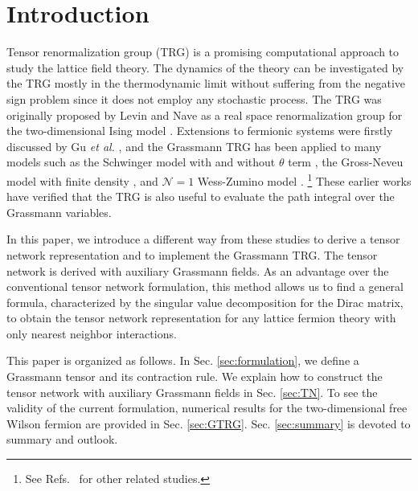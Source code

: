 
\section{Introduction}
\label{sec:introduction}

Tensor renormalization group (TRG) is a promising computational approach to study the lattice field theory. 
The dynamics of the theory can be investigated by the TRG
mostly in the thermodynamic limit without suffering from the negative sign problem
since it does not employ any stochastic process. 
The TRG was originally proposed by Levin and Nave as a 
real space renormalization group 
for the two-dimensional Ising model \cite{Levin:2006jai}. 
Extensions to fermionic systems were firstly discussed by Gu {\it et al.} \cite{Gu:2010yh,Gu:2013gba},  
and the Grassmann TRG has been applied to many models such as
the Schwinger model with and without $\theta$ term 
\cite{Shimizu:2014uva,Shimizu:2014fsa,Shimizu:2017onf}, 
the Gross-Neveu model with finite density \cite{Takeda:2014vwa}, 
and $\mathcal{N}=1$ Wess-Zumino model \cite{Kadoh:2018hqq}.
\footnote{See Refs.~\cite{Sakai:2017jwp,Yoshimura:2017jpk,Meurice:2018fky,Butt:2019uul} for other related studies. }
These earlier works have verified that the TRG is also useful to evaluate 
the path integral over the Grassmann variables. 
 
In this paper, we introduce a different way from these studies to derive a tensor network 
representation and to implement the Grassmann TRG. The tensor network 
is derived with auxiliary Grassmann fields. 
As an advantage over the conventional tensor network formulation, 
this method allows us to find a general formula, characterized by the singular 
value decomposition for the Dirac matrix, to obtain the tensor network representation for any lattice 
fermion theory with only nearest neighbor interactions. 


This paper is organized as follows. In Sec. \ref{sec:formulation}, we define a 
Grassmann tensor and its contraction rule. We explain how to construct the 
tensor network with auxiliary Grassmann fields in Sec. \ref{sec:TN}. 
To see the validity of the current formulation, numerical results for the two-dimensional free 
Wilson fermion are provided in Sec. \ref{sec:GTRG}. Sec. \ref{sec:summary} is 
devoted to summary and outlook.

